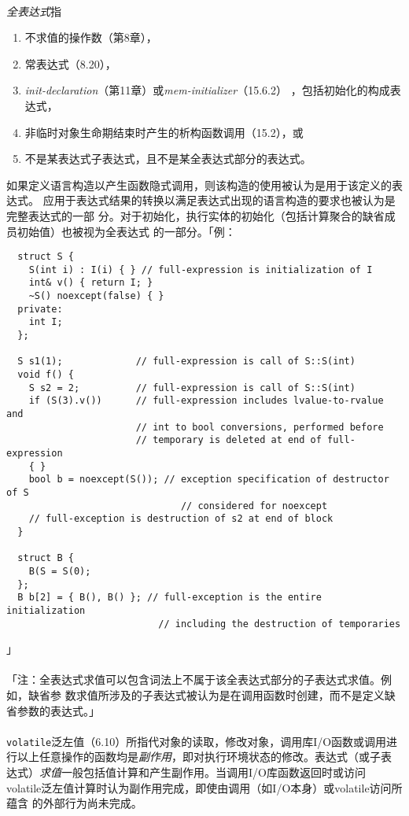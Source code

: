 \paragraph{}
\textit{全表达式}指
\begin{enumerate}
  \item 不求值的操作数（第8章），
  \item 常表达式（8.20），
  \item \textit{init-declaration}（第11章）或\textit{mem-initializer}（15.6.2）
    ，包括初始化的构成表达式，
  \item 非临时对象生命期结束时产生的析构函数调用（15.2），或
  \item 不是某表达式子表达式，且不是某全表达式部分的表达式。
\end{enumerate}
如果定义语言构造以产生函数隐式调用，则该构造的使用被认为是用于该定义的表达式。
应用于表达式结果的转换以满足表达式出现的语言构造的要求也被认为是完整表达式的一部
分。对于初始化，执行实体的初始化（包括计算聚合的缺省成员初始值）也被视为全表达式
的一部分。「例：
\begin{lstlisting}
  struct S {
    S(int i) : I(i) { } // full-expression is initialization of I
    int& v() { return I; }
    ~S() noexcept(false) { }
  private:
    int I;
  };

  S s1(1);             // full-expression is call of S::S(int)
  void f() {
    S s2 = 2;          // full-expression is call of S::S(int)
    if (S(3).v())      // full-expression includes lvalue-to-rvalue and
                       // int to bool conversions, performed before
                       // temporary is deleted at end of full-expression
    { }
    bool b = noexcept(S()); // exception specification of destructor of S
                               // considered for noexcept
    // full-exception is destruction of s2 at end of block
  }

  struct B {
    B(S = S(0);
  };
  B b[2] = { B(), B() }; // full-exception is the entire initialization
                           // including the destruction of temporaries
\end{lstlisting}
」

\paragraph{}
「注：全表达式求值可以包含词法上不属于该全表达式部分的子表达式求值。例如，缺省参
数求值所涉及的子表达式被认为是在调用函数时创建，而不是定义缺省参数的表达式。」

\paragraph{}
\texttt{volatile}泛左值（6.10）所指代对象的读取，修改对象，调用库I/O函数或调用进
行以上任意操作的函数均是\textit{副作用}，即对执行环境状态的修改。表达式（或子表
达式）\textit{求值}一般包括值计算和产生副作用。当调用I/O库函数返回时或访问
volatile泛左值计算时认为副作用完成，即使由调用（如I/O本身）或volatile访问所蕴含
的外部行为尚未完成。

